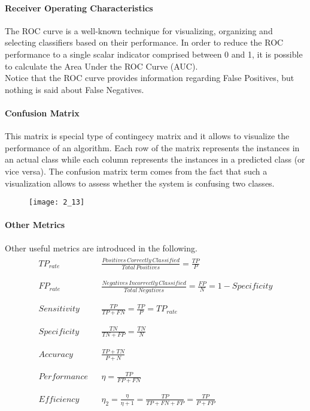 \paragraph{Receiver Operating Characteristics} The ROC curve is a well-known technique
for visualizing, organizing and selecting classifiers based on their performance.
In order to reduce the ROC performance to a single scalar indicator comprised between 0 and 1,
it is possible to calculate the Area Under the ROC Curve (AUC).\\
Notice that the ROC curve provides information regarding False Positives, but nothing
is said about False Negatives.
\paragraph{Confusion Matrix} This matrix is special type of contingecy matrix and
it allows to visualize the performance of an algorithm. Each row of the matrix
represents the instances in an actual class while each column represents the instances
in a predicted class (or vice versa). The confusion matrix term comes from the fact that
such a visualization allows to assess whether the system is confusing two classes.
\begin{figure}[H]
    \texttt{[image: 2\_13]}
    \centering
\end{figure}
\paragraph{Other Metrics} Other useful metrics are introduced in the following.
\begin{align*}
    \begin{matrix}
        TP_{rate}   &  & \frac{Positives\,Correctly\,Classified}{Total\,Positives}=\frac{TP}{P}                 \\\\\\
        FP_{rate}   &  & \frac{Negatives\,Incorrectly\,Classified}{Total\,Negatives}=\frac{FP}{N}=1-Specificity \\\\\\
        Sensitivity &  & \frac{TP}{TP+FN}=\frac{TP}{P}=TP_{rate}                                                \\\\\\
        Specificity &  & \frac{TN}{TN+FP}=\frac{TN}{N}                                                          \\\\\\
        Accuracy    &  & \frac{TP+TN}{P+N}                                                                      \\\\\\
        Performance &  & \eta=\frac{TP}{FP+FN}                                                                  \\\\\\
        Efficiency  &  & \eta_2=\frac{\eta}{\eta+1}=\frac{TP}{TP+FN+FP}=\frac{TP}{P+FP}
    \end{matrix}
\end{align*}